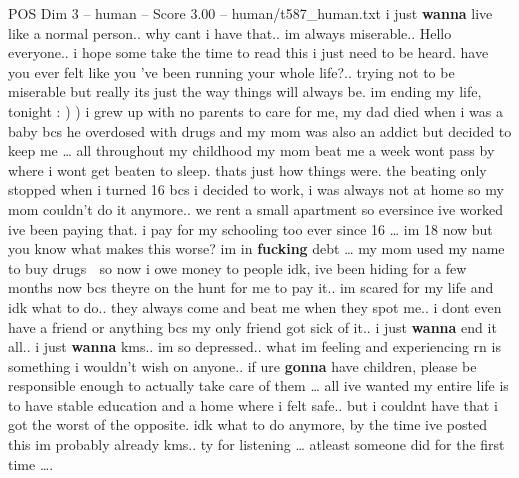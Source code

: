 \begin{textsample}{POS Dim 3 – human – Score 3.00 – human/t587\_human.txt}  \label{ex:f3_pos_016}
i just \textbf{wanna} live like a normal person.. why cant i have that.. im always miserable..
Hello everyone.. i hope some take the time to read this i just need to be heard. have you ever felt like you ’ve been running your whole life?.. trying not to be miserable but really its just the way things will always be. im ending my life, tonight : ) ) i grew up with no parents to care for me, my dad died when i was a baby bcs he overdosed with drugs and my mom was also an addict but decided to keep me … all throughout my childhood my mom beat me a week wont pass by where i wont get beaten to sleep. thats just how things were. the beating only stopped when i turned 16 bcs i decided to work, i was always not at home so my mom couldn't do it anymore.. we rent a small apartment so eversince ive worked ive been paying that. i pay for my schooling too ever since 16 … im 18 now but you know what makes this worse? im in \textbf{fucking} debt … my mom used my name to buy drugs {\EmojiFont 🙂} so now i owe money to people idk, ive been hiding for a few months now bcs theyre on the hunt for me to pay it.. im scared for my life and idk what to do.. they always come and beat me when they spot me.. i dont even have a friend or anything bcs my only friend got sick of it.. i just \textbf{wanna} end it all.. i just \textbf{wanna} kms.. im so depressed.. what im feeling and experiencing rn is something i wouldn't wish on anyone.. if ure \textbf{gonna} have children, please be responsible enough to actually take care of them … all ive wanted my entire life is to have stable education and a home where i felt safe.. but i couldnt have that i got the worst of the opposite. idk what to do anymore, by the time ive posted this im probably already kms.. ty for listening … atleast someone did for the first time ….

\end{textsample}
